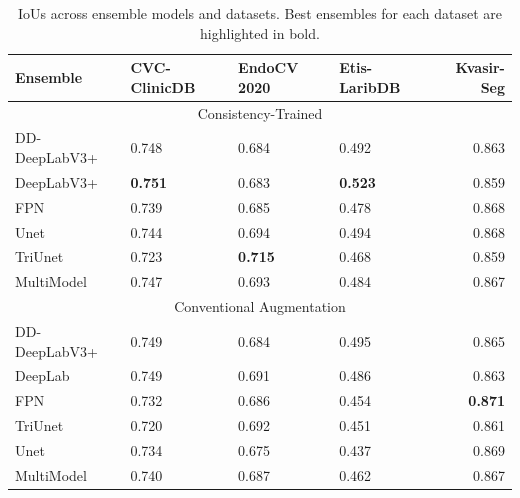 \begin{table}[htb]
    \centering
    \begin{tabularx}{\linewidth}{lXXXr}
\toprule
Ensemble  & CVC-ClinicDB & EndoCV 2020 & Etis-LaribDB & Kvasir-Seg \\
\midrule
\multicolumn{5}{c}{Consistency-Trained}\\
\midrule
DD-DeepLabV3+   & 0.748 &0.684 &0.492 &0.863 \\
DeepLabV3+      & \textbf{0.751} & 0.683 & \textbf{0.523} &0.859 \\
FPN             & 0.739 & 0.685 &0.478 & 0.868 \\
Unet            & 0.744 & 0.694 &0.494 & 0.868 \\
TriUnet         & 0.723 & \textbf{0.715} & 0.468 & 0.859 \\
MultiModel      & 0.747 & 0.693 &0.484 &0.867 \\
\midrule
\multicolumn{5}{c}{Conventional Augmentation}\\
\midrule
DD-DeepLabV3+   & 0.749 & 0.684 & 0.495 & 0.865 \\
DeepLab         & 0.749 & 0.691 & 0.486 & 0.863 \\
FPN             & 0.732 & 0.686 & 0.454 & \textbf{0.871} \\
TriUnet         & 0.720 & 0.692 & 0.451 & 0.861 \\
Unet            & 0.734 & 0.675 & 0.437 & 0.869 \\
MultiModel      & 0.740 & 0.687 & 0.462 & 0.867 \\
\bottomrule
\end{tabularx}
    \caption[IoUs across ensemble models and datasets. ]{IoUs across ensemble models and datasets. Best ensembles for each dataset are highlighted in bold.}
    \label{tab:ensembles}
\end{table}

